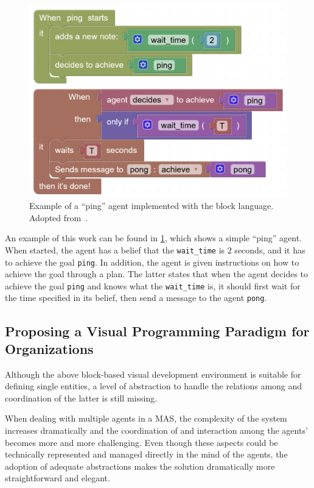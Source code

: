 \begin{figure}[H]
    \centering
    \includegraphics[width=0.9\linewidth]{images/blocks-example.png}
    \caption{Example of a ``ping'' agent implemented with the block language. Adopted from~\cite{burattini2022agent}.}
    \label{fig:blocks-example}
\end{figure}

An example of this work can be found in \cref{fig:blocks-example}, which shows a simple ``ping'' agent.
When started, the agent has a belief that the \texttt{wait\_time} is $2$ seconds, and it has to achieve the goal \texttt{ping}.
In addition, the agent is given instructions on how to achieve the goal through a plan.
The latter states that when the agent decides to achieve the goal \texttt{ping} and knows what the \texttt{wait\_time} is, it should first wait for the time specified in its belief, then send a message to the agent \texttt{pong}.

\subsection{Proposing a Visual Programming Paradigm for Organizations}
Although the above block-based visual development environment is suitable for defining single entities, a level of abstraction to handle the relations among and coordination of the latter is still missing.

When dealing with multiple agents in a MAS, the complexity of the system increases dramatically and the coordination of and interaction among the agents' becomes more and more challenging.
Even though these aspects could be technically represented and managed directly in the mind of the agents, the adoption of adequate abstractions makes the solution dramatically more straightforward and elegant. \cite{boissier2020multi}

